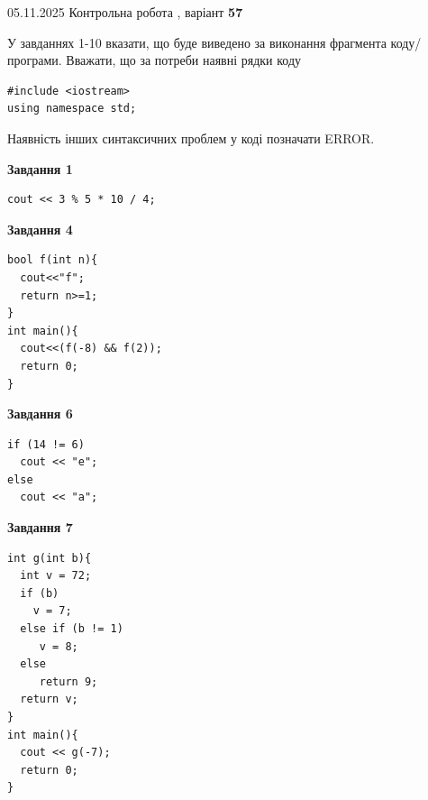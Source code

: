 \documentclass[12pt, ukrainian]{article}
\begin{document}
\newpage

{\Large{05.11.2025 Контрольна робота , варіант  \No \textbf { 57 }\par}}
{
\begin {large}
У завданнях 1-10 вказати, що буде виведено за виконання фрагмента коду/про\-гра\-ми.
Вважати, що за потреби наявні рядки коду
\begin{verbatim}
#include <iostream>
using namespace std;
\end{verbatim}
Наявність інших синтаксичних проблем у коді позначати ERROR.

\begin{minipage}[t]{7.0cm}

\begin{center}
\textbf{Завдання 1}
\end{center}
\vspace{-8mm}

\begin{verbatim}
cout << 3 % 5 * 10 / 4;
\end{verbatim}



\begin{center}
\textbf{Завдання 4}
\end{center}
\vspace{-8mm}

\begin{verbatim}
bool f(int n){
  cout<<"f";
  return n>=1;
}
int main(){
  cout<<(f(-8) && f(2));
  return 0;
}
\end{verbatim}



\begin{center}
\textbf{Завдання 6}
\end{center}
\vspace{-8mm}

\begin{verbatim}
if (14 != 6)
  cout << "e";
else
  cout << "a";
\end{verbatim}



\begin{center}
\textbf{Завдання 7}
\end{center}
\vspace{-8mm}

\begin{verbatim}
int g(int b){
  int v = 72;
  if (b)
    v = 7;
  else if (b != 1)
     v = 8;
  else
     return 9;
  return v;
}
int main(){
  cout << g(-7);
  return 0;
}
\end{verbatim}


\end{minipage}
\end{large}}
\end{document}
